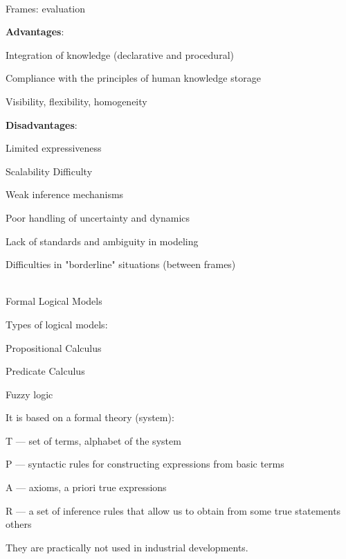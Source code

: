 \begin{frame}{\\Frames: evaluation}
	\topline
	\justifying
	
	\vspace{10mm}
	\textbf{Advantages}:
	\begin{textitemize}
		\item Integration of knowledge (declarative and procedural)
		\item Compliance with the principles of human knowledge storage
		\item Visibility, flexibility, homogeneity
	\end{textitemize}
	
	\textbf{Disadvantages}:
	\begin{textitemize}
		\item Limited expressiveness
		\item Scalability Difficulty
		\item Weak inference mechanisms
		\item Poor handling of uncertainty and dynamics
		\item Lack of standards and ambiguity in modeling
		\item Difficulties in "borderline" situations (between frames)
	\end{textitemize}
	
\end{frame}

\begin{frame}{\\Formal Logical Models}
	\topline
	\justifying
	
	\vspace{10mm}
	Types of logical models:
	\begin{textitemize}
		\item Propositional Calculus
		\item Predicate Calculus
		\item Fuzzy logic
	\end{textitemize}
	
	It is based on a formal theory (system):
	\begin{textitemize}
		\item T --- set of terms, alphabet of the system
		\item P --- syntactic rules for constructing expressions from basic terms
		\item A --- axioms, a priori true expressions
		\item R --- a set of inference rules that allow us to obtain from some true statements others
	\end{textitemize}
	
	They are practically not used in industrial developments.
	
\end{frame}

